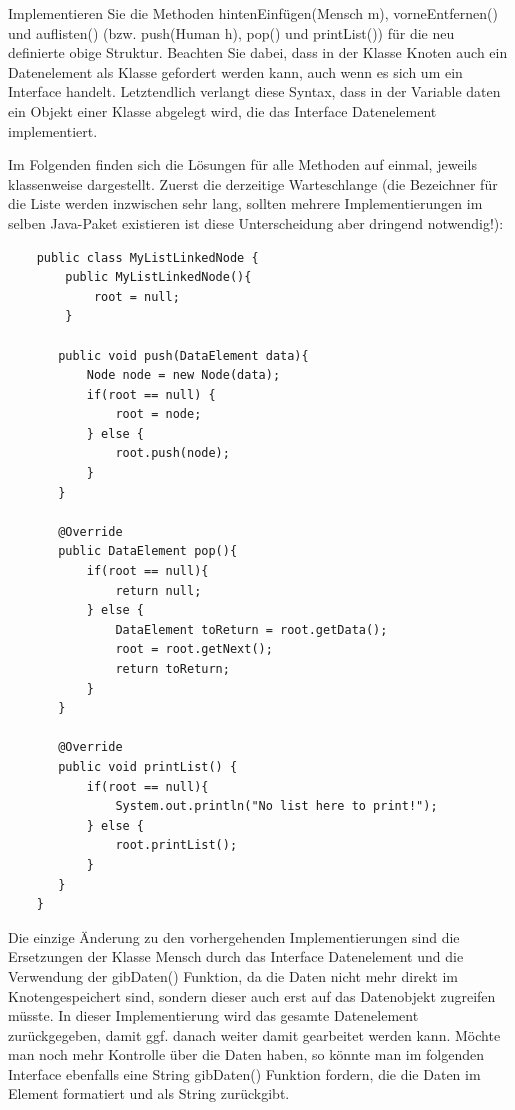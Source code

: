 \documentclass{article}
\begin{document}
\begin{task}{2}
    Implementieren Sie die Methoden hintenEinfügen(Mensch m), vorneEntfernen() und auflisten() (bzw. push(Human h), pop() und printList()) für die neu definierte obige Struktur. Beachten Sie dabei, dass in der Klasse Knoten auch ein Datenelement als Klasse gefordert werden kann, auch wenn es sich um ein Interface handelt. Letztendlich verlangt diese Syntax, dass in der Variable daten ein Objekt einer Klasse abgelegt wird, die das Interface Datenelement implementiert.
\end{task}

Im Folgenden finden sich die Lösungen für alle Methoden auf einmal, jeweils klassenweise dargestellt. Zuerst die derzeitige Warteschlange (die Bezeichner für die Liste werden inzwischen sehr lang, sollten mehrere Implementierungen im selben Java-Paket existieren ist diese Unterscheidung aber dringend notwendig!): 
\begin{verbatim}
    public class MyListLinkedNode {
        public MyListLinkedNode(){
            root = null;
        }

       public void push(DataElement data){
           Node node = new Node(data);
           if(root == null) {
               root = node;
           } else {
               root.push(node);
           }
       }

       @Override
       public DataElement pop(){
           if(root == null){
               return null;
           } else {
               DataElement toReturn = root.getData();
               root = root.getNext();
               return toReturn;
           }
       }

       @Override
       public void printList() {
           if(root == null){
               System.out.println("No list here to print!");
           } else {
               root.printList();
           }
       }
    }
\end{verbatim}
Die einzige Änderung zu den vorhergehenden Implementierungen sind die Ersetzungen der Klasse Mensch durch das Interface Datenelement und die Verwendung der gibDaten() Funktion, da die Daten nicht mehr direkt im Knotengespeichert sind, sondern dieser auch erst auf das Datenobjekt zugreifen müsste. In dieser Implementierung wird das gesamte Datenelement zurückgegeben, damit ggf. danach weiter damit gearbeitet werden kann. Möchte man noch mehr Kontrolle über die Daten haben, so könnte man im folgenden Interface ebenfalls eine String gibDaten() Funktion fordern, die die Daten im Element formatiert und als String zurückgibt.
\end{document}
